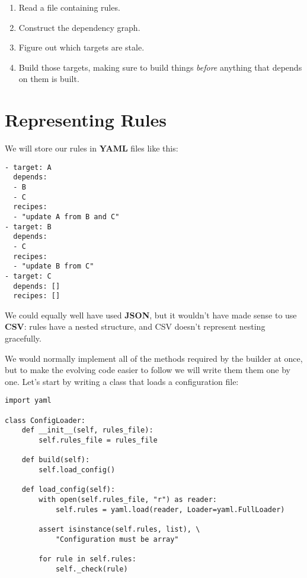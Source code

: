 \documentclass{scrbook}
\newcommand{\glossref}[1]{\textbf{#1}}
\begin{document}
\begin{enumerate}

\item 

Read a file containing rules.



\item 

Construct the dependency graph.



\item 

Figure out which targets are stale.



\item 

Build those targets,
    making sure to build things \emph{before} anything that depends on them is built.



\end{enumerate}


\section{Representing Rules}\label{builder-rules}


We will store our rules in \glossref{YAML} files like this:


\begin{lstlisting}[frame=single,frameround=tttt]
- target: A
  depends:
  - B
  - C
  recipes:
  - "update A from B and C"
- target: B
  depends:
  - C
  recipes:
  - "update B from C"
- target: C
  depends: []
  recipes: []
\end{lstlisting}



\noindent We could equally well have used \glossref{JSON},
but it wouldn't have made sense to use \glossref{CSV}:
rules have a nested structure,
and CSV doesn't represent nesting gracefully.


We would normally implement all of the methods required by the builder at once,
but to make the evolving code easier to follow we will write them them one by one.
Let's start by writing a class that loads a configuration file:


\begin{lstlisting}[frame=single,frameround=tttt]
import yaml

class ConfigLoader:
    def __init__(self, rules_file):
        self.rules_file = rules_file

    def build(self):
        self.load_config()

    def load_config(self):
        with open(self.rules_file, "r") as reader:
            self.rules = yaml.load(reader, Loader=yaml.FullLoader)

        assert isinstance(self.rules, list), \
            "Configuration must be array"

        for rule in self.rules:
            self._check(rule)
\end{lstlisting}
\end{document}
